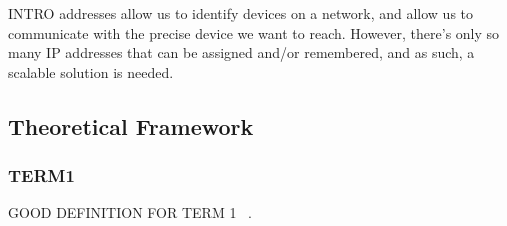 % 
% 
% 
% 
 INTRO addresses allow us to identify devices on a network,
and allow us to communicate with the precise device we want to reach.
However, there's only so many IP addresses that can be assigned and/or remembered, and as such,
a scalable solution is needed.




\subsection{Theoretical Framework}

\subsubsection{TERM1}
GOOD DEFINITION FOR TERM 1 ~\cite{kurose:2021}.

%
%


